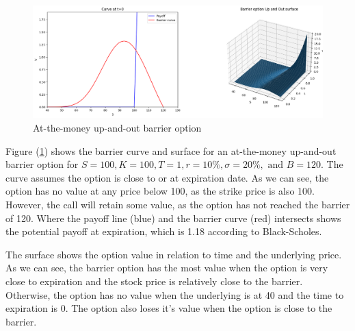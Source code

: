 \begin{figure}[H]
	\centering
	\includegraphics[width=.90\linewidth]{content/images/surface.png}
	\caption{At-the-money up-and-out barrier option}
	\label{fig:surface}
\end{figure}

Figure (\ref{fig:surface}) shows the barrier curve and surface for an at-the-money up-and-out barrier option for $S=100,K=100, T=1, r=10\%,\sigma=20\%, \text{ and }B=120$. The curve assumes the option is close to or at expiration date. As we can see, the option has no value at any price below 100, as the strike price is also 100. However, the call will retain some value, as the option has not reached the barrier of 120. Where the payoff line (blue) and the barrier curve (red) intersects shows the potential payoff at expiration, which is 1.18 according to Black-Scholes.

The surface shows the option value in relation to time and the underlying price. As we can see, the barrier option has the most value when the option is very close to expiration and the stock price is relatively close to the barrier. Otherwise, the option has no value when the underlying is at 40 and the time to expiration is 0. The option also loses it's value when the option is close to the barrier.
